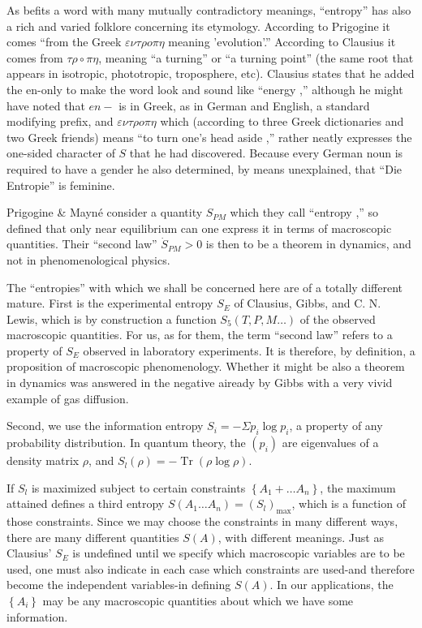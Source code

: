 \documentclass{article}
\begin{document}
As befits a word with many mutually contradictory meanings, ``entropy'' has also a rich and varied folklore concerning its etymology. According to Prigogine \cite{prigogine1961} it comes ``from the Greek $\varepsilon \nu \tau \rho o \pi \eta$ meaning 'evolution'.'' According to Clausius \cite{clausius1865} it comes from $\tau \rho \circ \pi \eta$, meaning ``a turning'' or ``a turning point'' (the same root that appears in isotropic, phototropic, troposphere, etc). Clausius states that he added the en-only to make the word look and sound like ``energy ,'' although he might have noted that $e n-$ is in Greek, as in German and English, a standard modifying prefix, and $\varepsilon \nu \tau \rho o \pi \eta$ which (according to three Greek dictionaries and two Greek friends) means ``to turn one's head aside ,'' rather neatly expresses the one-sided character of $S$ that he had discovered. Because every German noun is required to have a gender he also determined, by means unexplained, that ``Die Entropie'' is feminine.

Prigogine \& Mayné \cite{prigogine1974} consider a quantity $S_{P M}$ which they call ``entropy ,'' so defined that only near equilibrium can one express it in terms of macroscopic quantities. Their ``second law'' $\dot{S}_{P M}>0$ is then to be a theorem in dynamics, and not in phenomenological physics.

The ``entropies'' with which we shall be concerned here are of a totally different mature. First is the experimental entropy $S_E$ of Clausius, Gibbs, and C. N. Lewis, which is by construction a function $S_5(T, P, M \ldots)$ of the observed macroscopic quantities. For us, as for them, the term ``second law'' refers to a property of $S_E$ observed in laboratory experiments. It is therefore, by definition, a proposition of macroscopic phenomenology. Whether it might be also a theorem in dynamics was answered in the negative aiready by Gibbs \cite{gibbs1876} with a very vivid example of gas diffusion.

Second, we use the information entropy $S_i=-\Sigma p_i \log p_i$, a property of any probability distribution. In quantum theory, the $\left(p_i\right)$ are eigenvalues of a density matrix $\rho$, and $S_l(\rho)=-\operatorname{Tr}(\rho \log \rho)$.

If $S_l$ is maximized subject to certain constraints $\left\{A_1+\ldots A_n\right\}$, the maximum attained defines a third entropy $S\left(A_1 \ldots A_n\right)=\left(S_l\right)_{\max }$, which is a function of those constraints. Since we may choose the constraints in many different ways, there are many different quantities $S(A)$, with different meanings. Just as Clausius' $S_E$ is undefined until we specify which macroscopic variables are to be used, one must also indicate in each case which constraints are used-and therefore become the independent variables-in defining $S(A)$. In our applications, the $\left\{A_i\right\}$ may be any macroscopic quantities about which we have some information.
\end{document}
